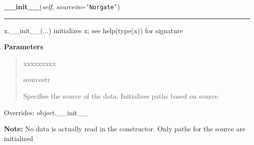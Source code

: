 \hspace{.8\funcindent}\begin{boxedminipage}{\funcwidth}

    \raggedright \textbf{\_\_init\_\_}(\textit{self}, \textit{sourcein}={\tt \texttt{'}\texttt{Norgate}\texttt{'}})

    \vspace{-1.5ex}

    \rule{\textwidth}{0.5\fboxrule}
\setlength{\parskip}{2ex}
    x.\_\_init\_\_(...) initializes x; see help(type(x)) for signature

\setlength{\parskip}{1ex}
      \textbf{Parameters}
      \vspace{-1ex}

      \begin{quote}
        \begin{Ventry}{xxxxxxxxx}

          \item[sourcestr]

          Specifies the source of the data. Initializes paths based on 
          source.

        \end{Ventry}

      \end{quote}

      Overrides: object.\_\_init\_\_

\textbf{Note:} No data is actually read in the constructor. Only paths for the source are 
initialized



    \end{boxedminipage}

    \label{QSTK:qstkutil:DataAccess:DataAccess:get_data_hardread}

    \vspace{0.5ex}

